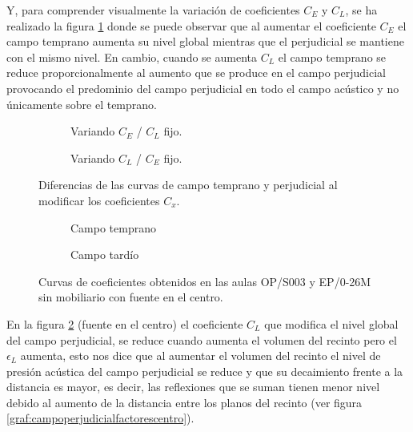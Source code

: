 Y, para comprender visualmente la variación de coeficientes $C_E$ y $C_L$, se ha realizado la figura \ref{graf:csdifer} donde se puede observar que al aumentar el coeficiente $C_E$ el campo temprano aumenta su nivel global mientras que el perjudicial se mantiene con el mismo nivel. En cambio, cuando se aumenta $C_L$ el campo temprano se reduce proporcionalmente al aumento que se produce en el campo perjudicial provocando el predominio del campo perjudicial en todo el campo acústico y no únicamente sobre el temprano.


\begin{figure}[ht]
    \begin{subfigure}[b]{0.4\textwidth}
    	\centering%
         {%
    }
    \caption{Variando $C_E$ / $C_L$ fijo.}%
    \end{subfigure}%
    \hspace{1.65cm}%
    \begin{subfigure}[b]{0.4\textwidth}%
    	\centering%
        {%
    }
    \caption{Variando $C_L$ / $C_E$ fijo.}%
    \end{subfigure}
    \caption{Diferencias de las curvas de campo temprano y perjudicial al modificar los coeficientes $C_x$.}
\label{graf:csdifer}%
\end{figure}
\FloatBarrier 

\begin{figure}[ht]
    \begin{subfigure}[b]{0.4\textwidth}
    	\centering%
         {%
    }
    \caption{Campo temprano}%
    \end{subfigure}%
    \hspace{1.65cm}%
    \begin{subfigure}[b]{0.4\textwidth}%
    	\centering%
        {%
    }
    \caption{Campo tardío}%
    \end{subfigure}
    \caption{Curvas de coeficientes obtenidos en las aulas OP/S003 y EP/0-26M sin mobiliario con fuente en el centro.}
\label{graf:comparacioncoefcentro}%
\end{figure}
\FloatBarrier 

En la figura \ref{graf:comparacioncoefcentro} (fuente en el centro) el coeficiente $C_L$ que modifica el nivel global del campo perjudicial, se reduce cuando aumenta el volumen del recinto pero el $\epsilon_L$ aumenta, esto nos dice que al aumentar el volumen del recinto el nivel de presión acústica del campo perjudicial se reduce y que su decaimiento frente a la distancia es mayor, es decir, las reflexiones que se suman tienen menor nivel debido al aumento de la distancia entre los planos del recinto (ver figura \ref{graf:campoperjudicialfactorescentro}).

